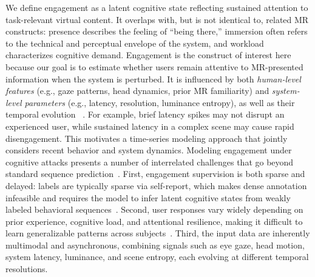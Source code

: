 \documentclass[review]{vgtc}                 %
\begin{document}
We define engagement as a latent cognitive state reflecting sustained attention to task-relevant virtual content. It overlaps with, but is not identical to, related MR constructs: presence describes the feeling of ``being there,'' immersion often refers to the technical and perceptual envelope of the system, and workload characterizes cognitive demand. Engagement is the construct of interest here because our goal is to estimate whether users remain attentive to MR-presented information when the system is perturbed. It is influenced by both \emph{human-level features} (e.g., gaze patterns, head dynamics, prior MR familiarity) and \emph{system-level parameters} (e.g., latency, resolution, luminance entropy), as well as their temporal evolution ~\cite{Wu2025Personalized}. For example, brief latency spikes may not disrupt an experienced user, while sustained latency in a complex scene may cause rapid disengagement. This motivates a time-series modeling approach that jointly considers recent behavior and system dynamics.
%
Modeling engagement under cognitive attacks presents a number of interrelated challenges that go beyond standard sequence prediction~\cite{10.1145/3706598.3713392}. First, engagement supervision is both sparse and delayed: labels are typically sparse via self-report, which makes dense annotation infeasible and requires the model to infer latent cognitive states from weakly labeled behavioral sequences~\cite{somarathna2023exploring}. Second, user responses vary widely depending on prior experience, cognitive load, and attentional resilience, making it difficult to learn generalizable patterns across subjects~\cite{10.1145/3419249.3421246}. Third, the input data are inherently multimodal and asynchronous, combining signals such as eye gaze, head motion, system latency, luminance, and scene entropy, each evolving at different temporal resolutions. 
\end{document}

